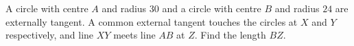A circle with centre $A$ and radius $30$ and a circle with centre $B$ and radius $24$ are externally tangent. A common external tangent touches the circles at $X$ and $Y$ respectively, and line $XY$ meets line $AB$ at $Z$. Find the length $BZ$.
